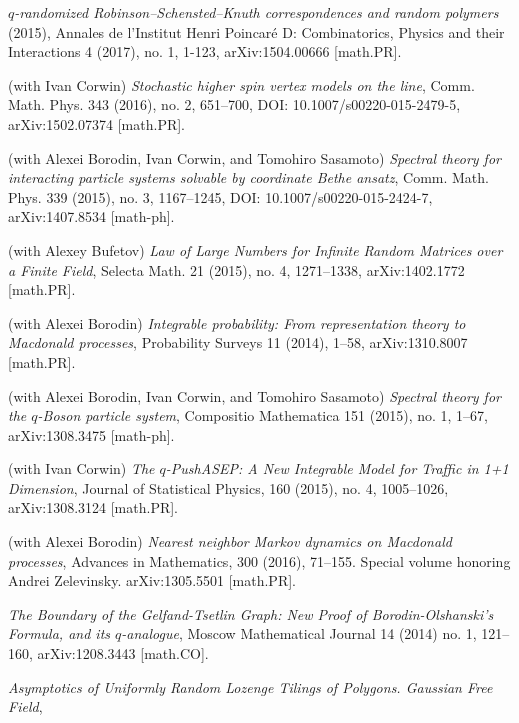 \documentclass[letterpaper,11pt]{article}
\begin{document}
\begin{etaremune}
	      \emph{$q$-randomized Robinson--Schensted--Knuth correspondences
		      and random polymers}
	      (2015),
	      Annales de l'Institut Henri Poincar\'e D: Combinatorics, Physics
	      and their Interactions 4 (2017), no. 1, 1-123, arXiv:1504.00666 [math.PR].
	\item
	      (with Ivan Corwin)
	      \emph{Stochastic higher spin vertex models on the line},
	      Comm. Math. Phys. 343 (2016), no. 2, 651--700, DOI:
	      10.1007/s00220-015-2479-5, arXiv:1502.07374 [math.PR].
	\item
	      (with Alexei Borodin, Ivan Corwin, and Tomohiro Sasamoto)
	      \emph{Spectral theory for interacting particle systems solvable
		      by coordinate Bethe ansatz},
	      Comm. Math. Phys. 339 (2015), no. 3, 1167--1245, DOI:
	      10.1007/s00220-015-2424-7, arXiv:1407.8534 [math-ph].
	\item
	      (with Alexey Bufetov)
	      \emph{Law of Large Numbers for Infinite Random Matrices over a
		      Finite Field},
	      Selecta Math. 21 (2015), no. 4, 1271--1338, arXiv:1402.1772
	      [math.PR].
	\item
	      (with Alexei Borodin)
	      \emph{Integrable probability: From representation theory to
		      Macdonald processes},
	      Probability Surveys 11 (2014), 1--58, arXiv:1310.8007 [math.PR].
	\item
	      (with Alexei Borodin, Ivan Corwin, and Tomohiro Sasamoto)
	      \emph{Spectral theory for the $q$-Boson particle system},
	      Compositio Mathematica 151 (2015), no. 1, 1--67, arXiv:1308.3475
	      [math-ph].
	\item
	      (with Ivan Corwin)
	      \emph{The $q$-PushASEP: A New Integrable Model for Traffic in
		      1+1 Dimension},
	      Journal of Statistical Physics, 160 (2015), no. 4, 1005--1026,
	      arXiv:1308.3124 [math.PR].
	\item
	      (with Alexei Borodin)
	      \emph{Nearest neighbor Markov dynamics on Macdonald processes},
	      Advances in Mathematics, 300 (2016), 71--155. Special volume
	      honoring Andrei Zelevinsky. arXiv:1305.5501 [math.PR].
	\item
	      \emph{The Boundary of the Gelfand-Tsetlin Graph: New Proof of
		      Borodin-Olshanski's Formula, and its $q$-analogue},
	      Moscow Mathematical Journal 14 (2014) no. 1, 121--160,
	      arXiv:1208.3443 [math.CO].
	\item
	      \emph{Asymptotics of Uniformly Random Lozenge Tilings of
		      Polygons. Gaussian Free Field},

\end{etaremune}
\end{document}
